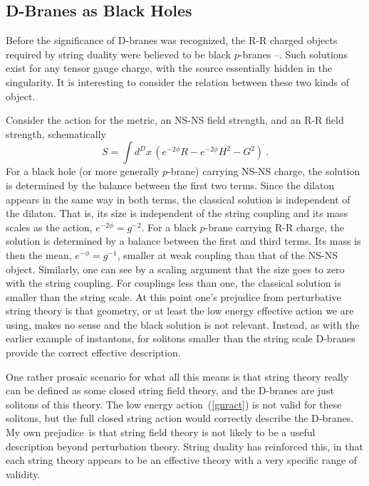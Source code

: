 \documentclass[12pt]{article}
\def\be{\begin{equation}}
\def\ee{\end{equation}}
\begin{document}
\subsection{D-Branes as Black Holes}

Before the significance of D-branes was recognized, the R-R charged objects
required by string duality were believed to be black
$p$-branes \cite{hullt}--\cite{coni}.
Such solutions exist for any tensor gauge charge, \cite{blackp} with the source
essentially hidden in the singularity.  It is interesting to consider the
relation between these two kinds of object.

Consider the action for the metric, an NS-NS field strength, and an R-R field
strength, schematically
\be
S = \int d^Dx\, \left( e^{-2\phi} R -  e^{-2\phi} H^2 -  G^2
\right) \ .  \label{gnract}
\ee
For a black hole (or more generally $p$-brane) carrying NS-NS charge, the
solution is determined by the balance between the first two terms.  Since the
dilaton appears in the same way in both terms, the classical solution is
independent of the dilaton.  That is, its size is independent of the string
coupling and its mass scales as the action,
$e^{-2\phi} = g^{-2}$. For a black $p$-brane carrying R-R charge, the solution
is determined by a balance between the first and third terms.  Its mass is
then the mean,
$e^{-\phi} = g^{-1}$, smaller at weak coupling than that of the NS-NS object. 
Similarly, one can see by a scaling argument that the size goes to zero with
the string coupling.  For couplings less than one, the classical solution is
smaller than the string scale.  At this point one's prejudice from
perturbative string theory is that geometry, or at least the low energy
effective action we are using, makes no sense and the black solution is not
relevant.
Instead, as with the earlier example of instantons, for solitons smaller than
the string scale D-branes provide the correct effective description.

One rather prosaic scenario for what all this means is that string theory
really can be defined as some closed string field theory, and the D-branes are
just solitons of this theory.  The low energy action~(\ref{gnract}) is not
valid for these solitons, but the full closed string action would correctly
describe the D-branes.  My own prejudice\, \cite{lesh} is that string field
theory is not likely to be a useful description beyond perturbation theory.
String duality has reinforced this, in that each string theory
appears to be an effective theory with a very specific range of validity.
\end{document}
